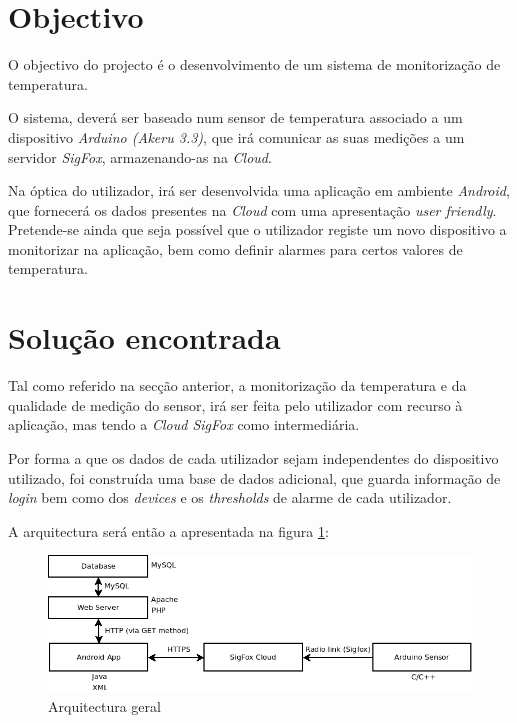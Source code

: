 \documentclass[a4paper]{article}
\begin{document}


\tableofcontents
{}
\pagebreak

\section{Objectivo}

O objectivo do projecto é o desenvolvimento de um sistema de monitorização de temperatura. 

O sistema, deverá ser baseado num sensor de temperatura associado a um dispositivo \textit{Arduino (Akeru 3.3)}, que irá comunicar as suas medições a um servidor \textit{SigFox}, armazenando-as na \textit{Cloud}.

Na óptica do utilizador, irá ser desenvolvida uma aplicação em ambiente \textit{Android}, que fornecerá os dados presentes na \textit{Cloud} com uma apresentação \textit{user friendly}. Pretende-se ainda que seja possível que o utilizador registe um novo dispositivo a monitorizar na aplicação, bem como definir alarmes para certos valores de temperatura.


\section{Solução encontrada}

Tal como referido na secção anterior, a monitorização da temperatura e da qualidade de medição do sensor, irá ser feita pelo utilizador com recurso à aplicação, mas tendo a \textit{Cloud SigFox} como intermediária.

Por forma a que os dados de cada utilizador sejam independentes do dispositivo utilizado, foi construída uma base de dados adicional, que guarda informação de \textit{login} bem como dos \textit{devices} e os \textit{thresholds} de alarme de cada utilizador.

A arquitectura será então a apresentada na figura \ref{fig:general}:
\vspace{2mm}

\begin{figure}[hb]
  \centering
  \includegraphics[scale=0.45]{general.png}
  \caption{Arquitectura geral}
  \label{fig:general}
\end{figure}
\end{document}
